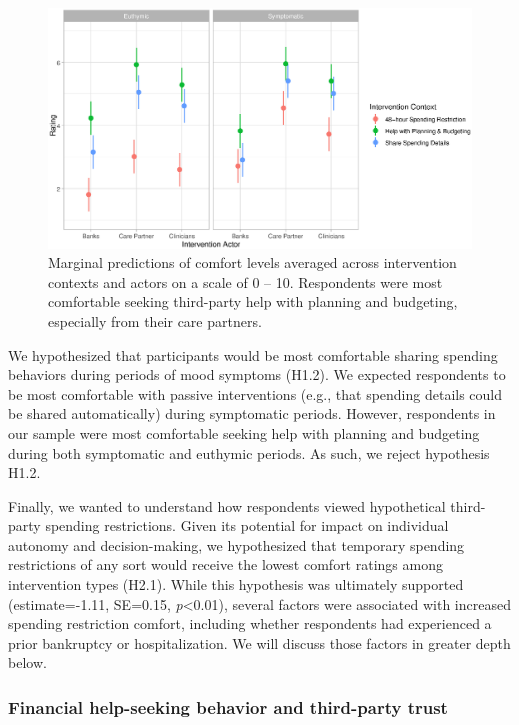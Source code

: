\documentclass[10pt]{article}
\begin{document}
\begin{figure}[!ht]
  \centering
  \includegraphics[scale=0.6]{figures/expl_main_actors_context_moodstate.eps}
  \caption{Marginal predictions of comfort levels averaged across intervention contexts and actors on a scale of 0 -- 10. Respondents were most comfortable seeking third-party help with planning and budgeting, especially from their care partners.}
  \label{fig:expl_main_actors_context_moodstate}
\end{figure}

We hypothesized that participants would be most comfortable sharing spending behaviors during periods of mood symptoms (H1.2). We expected respondents to be most comfortable with passive interventions (e.g., that spending details could be shared automatically) during symptomatic periods. However, respondents in our sample were most comfortable seeking help with planning and budgeting during both symptomatic and euthymic periods. As such, we reject hypothesis H1.2. 

Finally, we wanted to understand how respondents viewed hypothetical third-party spending restrictions. Given its potential for impact on individual autonomy and decision-making, we hypothesized that temporary spending restrictions of any sort would receive the lowest comfort ratings among intervention types (H2.1). While this hypothesis was ultimately supported (estimate=-1.11, SE=0.15, \emph{p}\textless0.01), several factors were associated with increased spending restriction comfort, including whether respondents had experienced a prior bankruptcy or hospitalization. We will discuss those factors in greater depth below.

\subsubsection{Financial help-seeking behavior and third-party trust}
\end{document}

